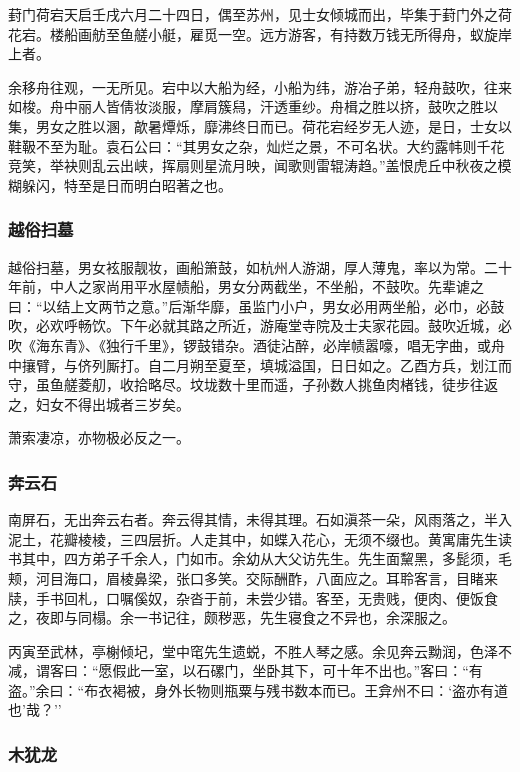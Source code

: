 \documentclass[]{article}
\begin{document}
葑门荷宕天启壬戌六月二十四日，偶至苏州，见士女倾城而出，毕集于葑门外之荷花宕。楼船画舫至鱼艖小艇，雇觅一空。远方游客，有持数万钱无所得舟，蚁旋岸上者。

余移舟往观，一无所见。宕中以大船为经，小船为纬，游冶子弟，轻舟鼓吹，往来如梭。舟中丽人皆倩妆淡服，摩肩簇舄，汗透重纱。舟楫之胜以挤，鼓吹之胜以集，男女之胜以溷，歊暑燂烁，靡沸终日而已。荷花宕经岁无人迹，是日，士女以鞋靸不至为耻。袁石公曰：``其男女之杂，灿烂之景，不可名状。大约露帏则千花竞笑，举袂则乱云出峡，挥扇则星流月映，闻歌则雷辊涛趋。''盖恨虎丘中秋夜之模糊躲闪，特至是日而明白昭著之也。

\hypertarget{header-n63}{%
\subsubsection{越俗扫墓}\label{header-n63}}

越俗扫墓，男女袨服靓妆，画船箫鼓，如杭州人游湖，厚人薄鬼，率以为常。二十年前，中人之家尚用平水屋帻船，男女分两截坐，不坐船，不鼓吹。先辈谑之曰：``以结上文两节之意。''后渐华靡，虽监门小户，男女必用两坐船，必巾，必鼓吹，必欢呼畅饮。下午必就其路之所近，游庵堂寺院及士夫家花园。鼓吹近城，必吹《海东青》、《独行千里》，锣鼓错杂。酒徒沾醉，必岸帻嚣嚎，唱无字曲，或舟中攘臂，与侪列厮打。自二月朔至夏至，填城溢国，日日如之。乙酉方兵，划江而守，虽鱼艖菱舠，收拾略尽。坟垅数十里而遥，子孙数人挑鱼肉楮钱，徒步往返之，妇女不得出城者三岁矣。

萧索凄凉，亦物极必反之一。

\hypertarget{header-n69}{%
\subsubsection{奔云石}\label{header-n69}}

南屏石，无出奔云右者。奔云得其情，未得其理。石如滇茶一朵，风雨落之，半入泥土，花瓣棱棱，三四层折。人走其中，如蝶入花心，无须不缀也。黄寓庸先生读书其中，四方弟子千余人，门如市。余幼从大父访先生。先生面黧黑，多髭须，毛颊，河目海口，眉棱鼻梁，张口多笑。交际酬酢，八面应之。耳聆客言，目睹来牍，手书回札，口嘱傒奴，杂沓于前，未尝少错。客至，无贵贱，便肉、便饭食之，夜即与同榻。余一书记往，颇秽恶，先生寝食之不异也，余深服之。

丙寅至武林，亭榭倾圮，堂中窀先生遗蜕，不胜人琴之感。余见奔云黝润，色泽不减，谓客曰：``愿假此一室，以石磥门，坐卧其下，可十年不出也。''客曰：``有盗。''余曰：``布衣褐被，身外长物则瓶粟与残书数本而已。王弇州不曰：`盗亦有道也'哉？''

\hypertarget{header-n75}{%
\subsubsection{木犹龙}\label{header-n75}}
\end{document}

